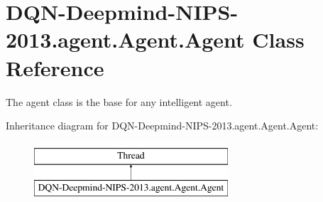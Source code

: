 \hypertarget{classDQN-Deepmind-NIPS-2013_1_1agent_1_1Agent_1_1Agent}{}\section{D\+Q\+N-\/\+Deepmind-\/\+N\+I\+P\+S-\/2013.agent.\+Agent.\+Agent Class Reference}
\label{classDQN-Deepmind-NIPS-2013_1_1agent_1_1Agent_1_1Agent}


The agent class is the base for any intelligent agent.  


Inheritance diagram for D\+Q\+N-\/\+Deepmind-\/\+N\+I\+P\+S-\/2013.agent.\+Agent.\+Agent\+:\begin{figure}[H]
\begin{center}
\leavevmode
\includegraphics[height=2.000000cm]{classDQN-Deepmind-NIPS-2013_1_1agent_1_1Agent_1_1Agent}
\end{center}
\end{figure}
